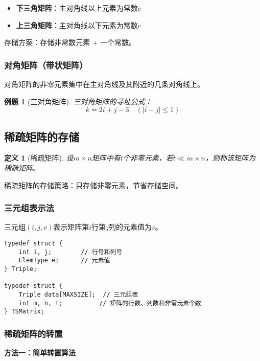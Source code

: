 \documentclass[12pt,a4paper]{amsart}
\newtheorem{definition}{定义}[section]
\newtheorem{example}{例题}[section]
\begin{document}
\begin{itemize}
\item \textbf{下三角矩阵}：主对角线以上元素为常数$c$
\item \textbf{上三角矩阵}：主对角线以下元素为常数$c$
\end{itemize}

存储方案：存储非常数元素 + 一个常数。

\subsubsection{对角矩阵（带状矩阵）}

对角矩阵的非零元素集中在主对角线及其附近的几条对角线上。

\begin{example}[三对角矩阵]
三对角矩阵的寻址公式：
$$k = 2i + j - 3 \quad (|i-j| \leq 1)$$
\end{example}

\subsection{稀疏矩阵的存储}

\begin{definition}[稀疏矩阵]
设$m \times n$矩阵中有$t$个非零元素，若$t \ll m \times n$，则称该矩阵为稀疏矩阵。
\end{definition}

稀疏矩阵的存储策略：只存储非零元素，节省存储空间。

\subsubsection{三元组表示法}

三元组$(i, j, v)$表示矩阵第$i$行第$j$列的元素值为$v$。

\begin{lstlisting}[caption=三元组结构定义]
typedef struct {
    int i, j;        // 行号和列号
    ElemType e;      // 元素值
} Triple;

typedef struct {
    Triple data[MAXSIZE];  // 三元组表
    int m, n, t;          // 矩阵的行数、列数和非零元素个数
} TSMatrix;
\end{lstlisting}

\subsubsection{稀疏矩阵的转置}

\textbf{方法一：简单转置算法}
\end{document}
